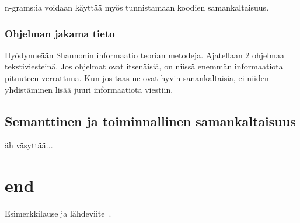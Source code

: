 \documentclass[finnish]{tktltiki2}
\theoremstyle{definition}
\theoremstyle{remark}
\begin{document}
n-grams:ia voidaan käyttää myös tunnistamaan koodien samankaltaisuus.
\subsubsection{Ohjelman jakama tieto}
Hyödynneään Shannonin informaatio teorian metodeja. Ajatellaan 2 ohjelmaa tekstiviesteinä. Jos ohjelmat ovat itsenäisiä, on niissä enemmän informaatiota pituuteen verrattuna. Kun jos taas ne ovat hyvin sanankaltaisia, ei niiden yhdistäminen lisää juuri informaatiota viestiin.

\subsection{Semanttinen ja toiminnallinen samankaltaisuus}
äh väsyttää...


\section{end}
Esimerkkilause ja lähdeviite~\cite{esimerkki}.


%
%
% 
%







% 
\end{document}
